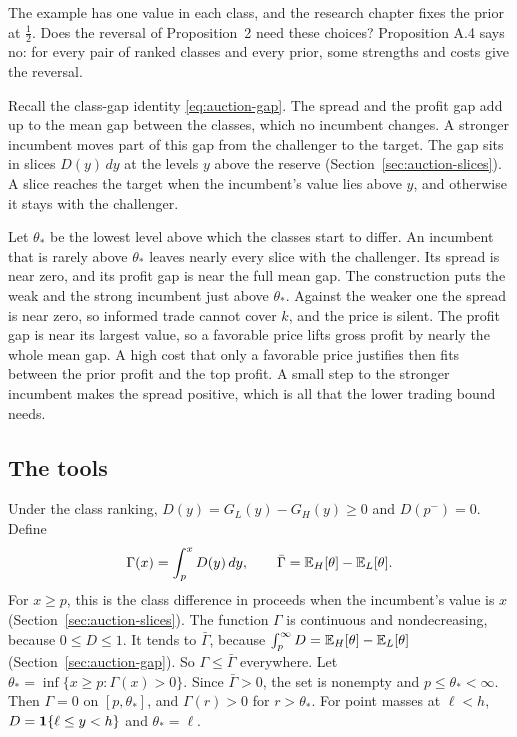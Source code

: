 The example has one value in each class, and the research chapter fixes the prior at \(\tfrac12\).
Does the reversal of Proposition~2 need these choices?
Proposition A.4 says no: for every pair of ranked classes and every prior, some strengths and costs give the reversal.

Recall the class-gap identity \eqref{eq:auction-gap}.
The spread and the profit gap add up to the mean gap between the classes, which no incumbent changes.
A stronger incumbent moves part of this gap from the challenger to the target.
The gap sits in slices \(D(y)\,dy\) at the levels \(y\) above the reserve (Section~\ref{sec:auction-slices}).
A slice reaches the target when the incumbent's value lies above \(y\), and otherwise it stays with the challenger.

Let \(\theta_*\) be the lowest level above which the classes start to differ.
An incumbent that is rarely above \(\theta_*\) leaves nearly every slice with the challenger.
Its spread is near zero, and its profit gap is near the full mean gap.
The construction puts the weak and the strong incumbent just above \(\theta_*\).
Against the weaker one the spread is near zero, so informed trade cannot cover \(k\), and the price is silent.
The profit gap is near its largest value, so a favorable price lifts gross profit by nearly the whole mean gap.
A high cost that only a favorable price justifies then fits between the prior profit and the top profit.
A small step to the stronger incumbent makes the spread positive, which is all that the lower trading bound needs.

\subsection{The tools}

Under the class ranking, \(D(y)=G_L(y)-G_H(y)\ge0\) and \(D(p^-)=0\).
Define
\[
\Gamma(x)=\int_p^xD(y)\,dy,\qquad \bar\Gamma=\mathbb{E}_H[\theta]-\mathbb{E}_L[\theta].
\]
For \(x\ge p\), this is the class difference in proceeds when the incumbent's value is \(x\) (Section~\ref{sec:auction-slices}).
The function \(\Gamma\) is continuous and nondecreasing, because \(0\le D\le1\).
It tends to \(\bar\Gamma\), because \(\int_p^\infty D=\mathbb{E}_H[\theta]-\mathbb{E}_L[\theta]\) (Section~\ref{sec:auction-gap}). So \(\Gamma\le\bar\Gamma\) everywhere.
Let \(\theta_*=\inf\{x\ge p:\Gamma(x)>0\}\).
Since \(\bar\Gamma>0\), the set is nonempty and \(p\le\theta_*<\infty\).
Then \(\Gamma=0\) on \([p,\theta_*]\), and \(\Gamma(r)>0\) for \(r>\theta_*\).
For point masses at \(\ell<h\), \(D=\mathbf{1}\{\ell\le y<h\}\) and \(\theta_*=\ell\).

